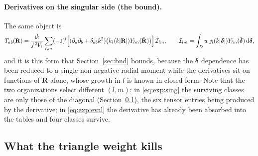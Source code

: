 \paragraph{Derivatives on the singular side (the bound).} The same object is
\begin{equation}
T_{ab}(\mathbf{R}) = \frac{\mathrm{i} k}{f^2 V_{\mathrm{t}}}\sum_{l,m}(-1)^l
\Bigl[(\partial_a\partial_b + \delta_{ab}k^2)
\bigl(h_l(k|\mathbf{R}|)Y_{lm}(\hat{\mathbf{R}})\bigr)\Bigr]\,\mathcal{I}_{lm},
\qquad
\mathcal{I}_{lm} = \int_D w\, j_l(k|\boldsymbol{\delta}|)Y_{lm}(\hat{\boldsymbol{\delta}})\,
\mathrm{d}\boldsymbol{\delta},
\label{eq:exp:sing}
\end{equation}
and it is this form that Section~\ref{sec:bnd} bounds, because the $\boldsymbol{\delta}$
dependence has been reduced to a single non-negative radial moment while the derivatives
sit on functions of $\mathbf{R}$ alone, whose growth in $l$ is known in closed form.
Note that the two organizations select different $(l,m)$: in \eqref{eq:exp:sing} the
surviving classes are only those of the diagonal (Section~\ref{sec:exp:parity}), the six
tensor entries being produced by the derivative; in \eqref{eq:exp:eval} the derivative has
already been absorbed into the tables and four classes survive.

\subsection{What the triangle weight kills}
\label{sec:exp:parity}


